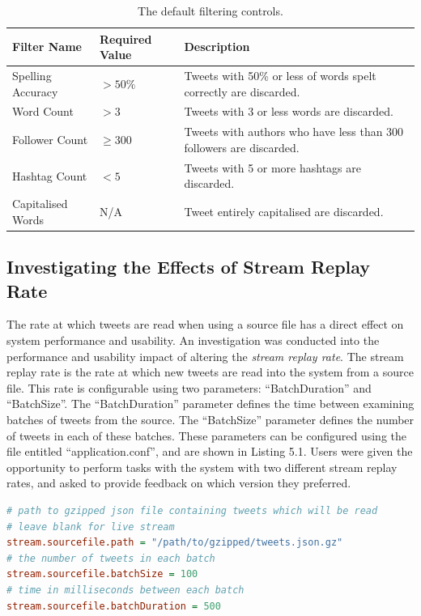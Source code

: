 \documentclass{l4proj}
\begin{document}
\begin{table}
    \centering
    \begin{tabular}{| l | l | l |}
    \hline
    Filter Name & Required Value & Description\\ \hline
    Spelling Accuracy & $>50\%$ & Tweets with 50\% or less of words spelt correctly are discarded.  \\ \hline
    Word Count & $>3$ & Tweets with 3 or less words are discarded.  \\ \hline
    Follower Count & $\geq300$ & Tweets with authors who have less than 300 followers are discarded. \\ \hline
    Hashtag Count & $<5$ & Tweets with 5 or more hashtags are discarded. \\ \hline
    Capitalised Words & N/A & Tweet entirely capitalised are discarded. \\
    
    \hline
    \end{tabular}
    \caption{\label{table:standardfilters}The default filtering controls.}
\end{table}

    
    \subsection{Investigating the Effects of Stream Replay Rate}
    The rate at which tweets are read when using a source file has a direct effect on system performance and usability. An investigation was conducted into the performance and usability impact of altering the \textit{stream replay rate}. The stream replay rate is the rate at which new tweets are read into the system from a source file. This rate is configurable using two parameters: ``BatchDuration'' and ``BatchSize''. The ``BatchDuration'' parameter defines the time between examining batches of tweets from the source. The ``BatchSize'' parameter defines the number of tweets in each of these batches. These parameters can be configured using the file entitled ``application.conf'', and are shown in Listing 5.1. Users were given the opportunity to perform tasks with the system with two different stream replay rates, and asked to provide feedback on which version they preferred.
    
\begin{lstlisting}[caption=Configuration of the stream replay rate in application.conf,language=Ini]
# path to gzipped json file containing tweets which will be read
# leave blank for live stream
stream.sourcefile.path = "/path/to/gzipped/tweets.json.gz"
# the number of tweets in each batch
stream.sourcefile.batchSize = 100
# time in milliseconds between each batch
stream.sourcefile.batchDuration = 500
\end{lstlisting}
\end{document}
